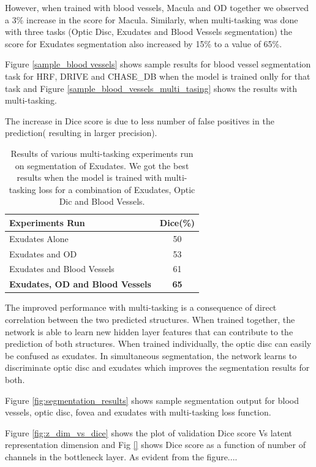 \documentclass{article}
\begin{document}
However, when trained with blood vessels, Macula and OD together we observed a 3\% increase in the score for Macula. Similarly, when multi-tasking was done with three tasks (Optic Disc, Exudates and Blood Vessels segmentation) the score for Exudates segmentation also increased by 15\% to a value of 65\%.


Figure \ref{sample_blood vessels} shows sample results for blood vessel segmentation task for HRF, DRIVE and CHASE\_DB  when the model is trained onlly for that task and Figure \ref{sample_blood_vessels_multi_tasing} shows the results with multi-tasking.

The increase in Dice score is due to less number of false positives in the prediction( resulting in larger precision).

\begin{table}
\caption{Results of various multi-tasking experiments run on segmentation of Exudates. We got the best results when the model is trained with multi-tasking loss for a combination of Exudates, Optic Dic and Blood Vessels.}
\begin{center}
\begin{tabular}{ |l|c|  }
\hline
\textbf{Experiments Run} & \textbf{Dice(\%)} \\
\hline
Exudates Alone & 50 \\
\hline
Exudates and OD & 53 \\
\hline
Exudates and Blood Vessels & 61 \\
\hline
\textbf{Exudates, OD and Blood Vessels} & \textbf{65} \\
\hline
\end{tabular}
\end{center}
\end{table}

The improved performance with multi-tasking is a consequence of direct correlation between the two predicted structures. When trained together, the network is able to learn new hidden layer features that can contribute to the prediction of both structures. When trained individually, the optic disc can easily be confused as exudates. In simultaneous segmentation, the network learns to discriminate optic disc and exudates which improves the segmentation results for both.

Figure \ref{fig:segmentation_results} shows sample segmentation output for  blood vessels, optic disc, fovea and exudates with multi-tasking loss function.

Figure \ref{fig:z_dim_vs_dice} shows the plot of validation Dice score Vs latent representation  dimension and Fig \ref{}  shows Dice score as a function of  number of channels in the bottleneck layer. As evident from the figure....
\end{document}
